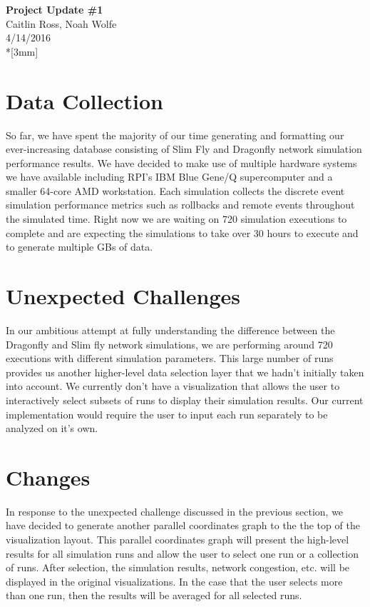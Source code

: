 \documentclass[12pt]{article}
\begin{document}
\thispagestyle{empty}
\begin{center}
{\Large\bf Project Update \#1}
\vspace{3mm}
\\Caitlin Ross, Noah Wolfe
\\4/14/2016
\\*[3mm]
\end{center}

\section{Data Collection}
So far, we have spent the majority of our time generating and formatting our ever-increasing database consisting of Slim Fly and Dragonfly network simulation performance results. We have decided to make use of multiple hardware systems we have available including RPI's IBM Blue Gene/Q supercomputer and a smaller 64-core AMD workstation. Each simulation collects the discrete event simulation performance metrics such as rollbacks and remote events throughout the simulated time. Right now we are waiting on 720 simulation executions to complete and are expecting the simulations to take over 30 hours to execute and to generate multiple GBs of data.

\section{Unexpected Challenges}
In our ambitious attempt at fully understanding the difference between the Dragonfly and Slim fly network simulations, we are performing around 720 executions with different simulation parameters. This large number of runs provides us another higher-level data selection layer that we hadn't initially taken into account. We currently don't have a visualization that allows the user to interactively select subsets of runs to display their simulation results. Our current implementation would require the user to input each run separately to be analyzed on it's own.

\section{Changes}
In response to the unexpected challenge discussed in the previous section, we have decided to generate another parallel coordinates graph to the the top of the visualization layout. This parallel coordinates graph will present the high-level results for all simulation runs and allow the user to select one run or a collection of runs. After selection, the simulation results, network congestion, etc. will be displayed in the original visualizations. In the case that the user selects more than one run, then the results will be averaged for all selected runs. 
\end{document}
